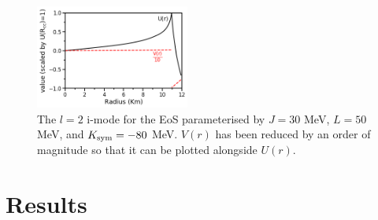 \documentclass[fleqn,usenatbib]{mnras}
\begin{document}
\begin{figure}
\centering
\includegraphics[width=0.45\textwidth,angle=0]{2i2_30_50_-80.png}
\caption{The $l=2$ i-mode for the EoS parameterised by $J=30$ MeV, $L=50$ MeV, and $K_{\rm sym}=-80$ MeV. $V(r)$ has been reduced by an order of magnitude so that it can be plotted alongside $U(r)$.}
\label{fig:2i_mode}
\end{figure}











\section{Results}
\end{document}
